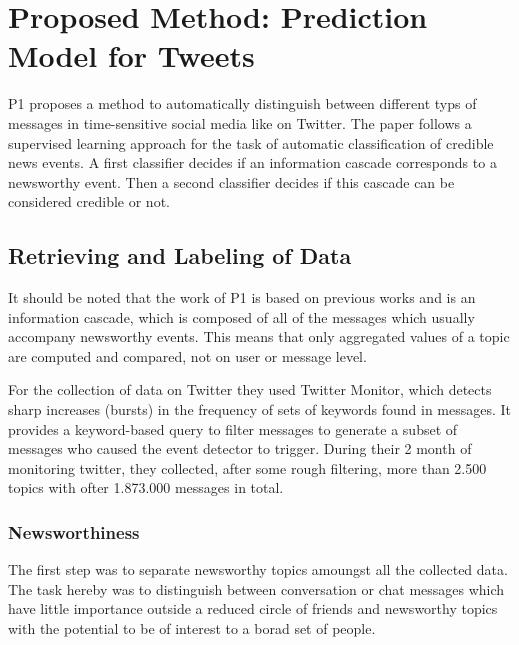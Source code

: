 \documentclass{proseminar}
\begin{document}

\section{Proposed Method: Prediction\\ Model for Tweets}
P1 proposes a method to automatically distinguish between different typs of messages in time-sensitive social media like on Twitter.
The paper follows a supervised learning approach for the task of automatic classification of credible news events. A first classifier decides if an information cascade corresponds to a newsworthy event. Then a second classifier decides if this cascade can be considered credible or not.


\subsection{Retrieving and Labeling of Data}
It should be noted that the work of P1 is based on previous works and is an information cascade, which is composed of all of the messages which usually accompany newsworthy events. This means that only aggregated values of a topic are computed and compared, not on user or message level.

For the collection of data on Twitter they used Twitter Monitor, which detects sharp increases (bursts) in the frequency of sets of keywords found in messages. It provides a keyword-based query to filter messages to generate a subset of messages who caused the event detector to trigger.
During their 2 month of monitoring twitter, they collected, after some rough filtering, more than 2.500 topics with ofter 1.873.000 messages in total.

\subsubsection*{Newsworthiness}
The first step was to  separate newsworthy topics amoungst all the collected data. The task hereby was to distinguish between conversation or chat messages which have little importance outside a reduced circle of friends and newsworthy topics with the potential to be of interest to a borad set of people.
\end{document}
